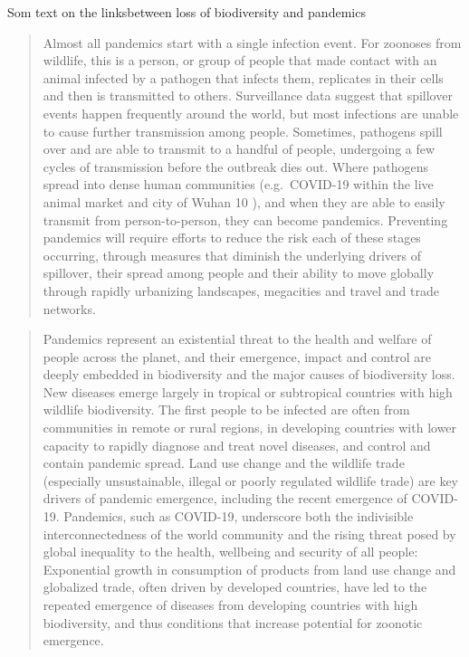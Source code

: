 \documentclass[
]{book}
\begin{document}
Som text on the linksbetween loss of biodiversity and pandemics

\begin{quote}
Almost all pandemics start with a single infection event. For zoonoses from wildlife, this is a person, or group of people that made contact with an animal infected by a pathogen that infects them, replicates in their cells and then is transmitted to others. Surveillance data suggest that spillover events happen frequently around the world, but most infections are unable to cause further transmission among people. Sometimes, pathogens spill over and are able to transmit to a handful of people, undergoing a few cycles of transmission before the outbreak dies out. Where pathogens spread into dense human communities (e.g.~COVID-19 within the live animal market and city of Wuhan 10 ), and when they are able to easily transmit from person-to-person, they can become pandemics. Preventing pandemics will require efforts to reduce the risk each of these stages occurring, through measures that diminish the underlying drivers of spillover, their spread among people and their ability to move globally through rapidly urbanizing landscapes, megacities and travel and trade networks.
\end{quote}

\begin{quote}
Pandemics represent an existential threat to the health and welfare of people across the planet, and their emergence, impact and control are deeply embedded in biodiversity and the major causes of biodiversity loss. New diseases emerge largely in tropical or subtropical countries with high wildlife biodiversity. The first people to be infected are often from communities in remote or rural regions, in developing countries with lower capacity to rapidly diagnose and treat novel diseases, and control and contain pandemic spread. Land use change and the wildlife trade (especially unsustainable, illegal or poorly regulated wildlife trade) are key drivers of pandemic emergence, including the recent emergence of COVID-19. Pandemics, such as COVID-19, underscore both the indivisible interconnectedness of the world community and the rising threat posed by global inequality to the health, wellbeing and security of all people: Exponential growth in consumption of products from land use change and globalized trade, often driven by developed countries, have led to the repeated emergence of diseases from developing countries with high biodiversity, and thus conditions that increase potential for zoonotic emergence.
\end{quote}
\end{document}
